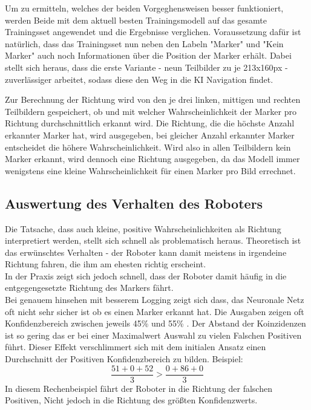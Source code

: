 \documentclass[conference]{IEEEtran}
\begin{document}

Um zu ermitteln, welches der beiden Vorgeghensweisen besser funktioniert, 
werden Beide mit dem aktuell besten Trainingsmodell auf das 
gesamte Trainingsset angewendet und die Ergebnisse verglichen.
Voraussetzung dafür ist natürlich, dass das Trainingsset nun neben den Labeln "Marker" und "Kein Marker" auch noch Informationen über die Position der Marker erhält.
Dabei stellt sich heraus, dass die erste Variante - neun Teilbilder zu je 213x160px - zuverlässiger arbeitet, sodass diese den Weg in die KI Navigation findet.


Zur Berechnung der Richtung wird von den je drei linken, mittigen und rechten Teilbildern gespeichert, ob und mit welcher Wahrscheinlichkeit der Marker pro Richtung durchschnittlich erkannt wird.
Die Richtung, die die höchste Anzahl erkannter Marker hat, wird ausgegeben, bei gleicher Anzahl erkannter Marker entscheidet die höhere Wahrscheinlichkeit.
Wird also in allen Teilbildern kein Marker erkannt, wird dennoch eine Richtung ausgegeben, da das Modell immer wenigstens eine kleine Wahrscheinlichkeit für einen Marker pro Bild errechnet.


\subsection {Auswertung des Verhalten des Roboters}	%

Die Tatsache, dass auch kleine, positive Wahrscheinlichkeiten als Richtung 
interpretiert werden, stellt sich schnell als problematisch heraus.
Theoretisch ist das erwünschtes Verhalten - der Roboter kann damit 
meistens in irgendeine Richtung fahren, die ihm am ehesten richtig 
erscheint.\\
In der Praxis zeigt sich jedoch schnell, dass der Roboter damit häufig in die 
entgegengesetzte Richtung des Markers fährt. \\

Bei genauem hinsehen mit besserem Logging  zeigt sich dass, das Neuronale 
Netz oft nicht sehr sicher ist ob es einen Marker erkannt hat. Die Ausgaben 
zeigen  oft Konfidenzbereich  zwischen jeweils 45\% und 55\% . Der Abstand 
der Koinzidenzen ist so gering das er bei einer Maximalwert Auswahl zu 
vielen Falschen Positiven führt. Dieser Effekt verschlimmert sich mit dem 
initialen Ansatz einen Durchschnitt  der Positiven Konfidenzbereich zu 
bilden. Beispiel:
\[
\frac{51 + 0 +52 }{3} > \frac{0 + 86 + 0}{3}
\]
In diesem Rechenbeispiel fährt der Roboter in die Richtung der falschen 
Positiven, Nicht jedoch in die Richtung des größten Konfidenzwerts.\\
\end{document}
